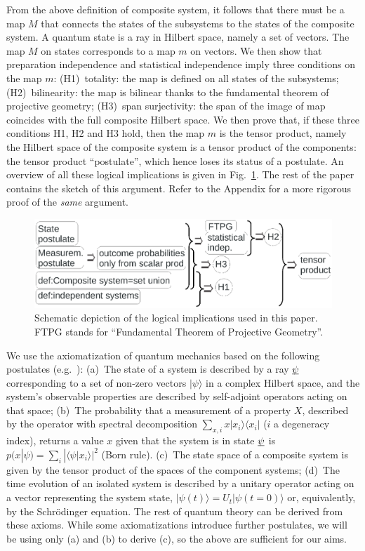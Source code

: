 \documentclass[aps,prl,amsmath,amssymb,twocolumn,nofootinbib]{revtex4}
\theoremstyle{plain}
\theoremstyle{definition}
\theoremstyle{remark}
\newcommand{\pj}[1] {\underbar{$#1$}}
\def\>{\rangle}
\def\<{\langle}
\begin{document}
From the above definition of composite system, it follows that there
must be a map $M$ that connects the states of the subsystems to the
states of the composite system. A quantum state is a ray in Hilbert
space, namely a set of vectors. The map $M$ on states 
corresponds to a map $m$ on vectors. We then show that preparation
independence and statistical independence imply three conditions on
the map $m$: (H1)~totality: the map is defined on all states of the
subsystems; (H2)~bilinearity: the map is bilinear thanks to the
fundamental theorem of projective geometry; (H3)~span surjectivity:
the span of the image of map coincides with the full composite Hilbert space.
We then prove that, if these three conditions H1, H2 and H3 hold, then
the map $m$ is the tensor product, namely the Hilbert space of the
composite system is a tensor product of the components: the tensor
product ``postulate'', which hence loses its status of a postulate. An
overview of all these logical implications is given in
Fig.~\ref{f:fig}. The rest of the paper contains the sketch of this
argument. Refer to the Appendix for a more rigorous proof of the \emph{same} argument.

\begin{figure}[ht]
\includegraphics[width=\linewidth, trim={0.2in 5.8in 2.5in 0.1in}, clip=true]{fig.eps}
\caption{Schematic depiction of the logical implications used
in this paper. FTPG stands for ``Fundamental Theorem of Projective Geometry''.  \label{f:fig}}\end{figure}

We use the axiomatization of quantum mechanics based on the following
postulates (e.g.~\cite{ozawa,masanes,nielsenchuang}): (a)~The state of a
system is described by a ray $\pj{\psi}$ corresponding to a set of
non-zero vectors $|\psi\>$ in a complex Hilbert space, and the
system's observable properties are described by self-adjoint operators
acting on that space; (b)~The probability that a measurement of a
property $X$, described by the operator with spectral decomposition
$\sum_{x,i}x|x_i\>\<x_i|$ ($i$ a degeneracy index), returns a value
$x$ given that the system is in state $\pj{\psi}$ is
$p(x|\psi)=\sum_i|\<\psi|x_i\>|^2$ (Born rule). (c)~The state
space of a composite system is given by the tensor product of the
spaces of the component systems; (d)~The time evolution of an isolated
system is described by a unitary operator acting on a vector
representing the system state, $|\psi({t})\>=U_{t}|\psi({t}=0)\>$ or,
equivalently, by the Schr\"odinger equation. The rest of quantum
theory can be derived from these axioms. While some axiomatizations
introduce further postulates, we will be using only (a) and (b) to
derive (c), so the above are sufficient for our aims.
\end{document}
